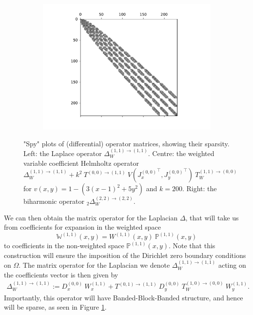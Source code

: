 \documentclass[11pt, oneside]{article}   	%
\newcommand{\Wii}{W^{(1,1)}}
\newcommand{\bigPii}{{\mathbb{P}^{(1,1)}}}
\newcommand{\laplacewii}{\Delta_W^{(1,1)\to(1,1)}}
\newcommand{\biharmonic}{_2\Delta_W^{(2,2)\to(2,2)}}
\newcommand{\bigWii}{{\mathbb{W}^{(1,1)}}}
\begin{document}
\begin{figure}
\begin{subfigure}[t]{0.3\textwidth}
	\includegraphics[scale=0.35]{sparsityofbiharmonic}
	\end{subfigure}
    	\caption{"Spy" plots of (differential) operator matrices, showing their sparsity. Left: the Laplace operator $\laplacewii$. Centre: the weighted variable coefficient Helmholtz operator $\laplacewii + k^2 \: T^{(0,0)\to(1,1)} \: V({J_x^{(0,0)}}^\top, {J_y^{(0,0)}}^\top) \: T_W^{(1,1)\to(0,0)}$ for $v(x,y) = 1 - (3(x-1)^2 + 5y^2)$ and $k = 200$. Right: the biharmonic operator $\biharmonic$.}
        \label{fig:sparsity}
\end{figure}

We can then obtain the matrix operator for the Laplacian \(\Delta\), that will take us from coefficients for expansion in the weighted space
$$
\bigWii(x,y) = \Wii(x,y) \: \bigPii(x,y)
$$
to coefficients in the non-weighted space $\bigPii(x,y)$. Note that this construction will ensure the imposition of the Dirichlet zero boundary conditions on $\Omega$. The matrix operator for the Laplacian we denote $\laplacewii$ acting on the coefficients vector is then given by
\begin{align}
    \laplacewii := D_x^{(0,0)} \: W_x^{(1,1)} + T^{(0,1)\to(1,1)} \: D_y^{(0,0)} \: T_W^{(1,0)\to(0,0)} \: W_y^{(1,1)}.
\end{align}
Importantly, this operator will have Banded-Block-Banded structure, and hence will be sparse, as seen in Figure \ref{fig:sparsity}.
\end{document}
